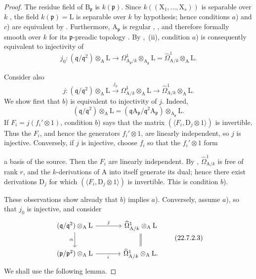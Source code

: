 \begin{proof}
The residue field of $\mathrm{B}_\mathfrak{p}$ is $k(\mathfrak{p})$.
Since $k((\mathrm{X}_1,\ldots,\mathrm{X}_s))$ is separable over $k$ , the field $k(\mathfrak{p})=\mathrm{L}$ is separable over $k$ by hypothesis; hence conditions $a$) and $c$) are equivalent by .
Furthermore, $\mathrm{A}_\mathfrak{p}$ is regular , , and therefore formally smooth over $k$ for its $\mathfrak{p}$-preadic topology .
By ,~(ii), condition $a$) is consequently equivalent to injectivity of
\begin{equation}
\label{0.22.7.2.1}
  j_0:(\mathfrak{q}/\mathfrak{q}^2)\otimes_\mathrm{A}\mathrm{L}
  \longrightarrow \Omega^1_{\mathrm{A}_\mathfrak{p}/k}\otimes_{\mathrm{A}_\mathfrak{p}}\mathrm{L}
  =\widehat{\Omega}^1_{\mathrm{A}/k}\otimes_\mathrm{A}\mathrm{L}.
  \tag{22.7.2.1}
\end{equation}

Consider also
\begin{equation}
\label{0.22.7.2.2}
  j:(\mathfrak{q}/\mathfrak{q}^2)\otimes_\mathrm{A}\mathrm{L}
  \xrightarrow{j_0}\Omega^1_{\mathrm{A}/k}\otimes_\mathrm{A}\mathrm{L}
  \longrightarrow\widehat{\Omega}^1_{\mathrm{A}/k}\otimes_\mathrm{A}\mathrm{L}.
  \tag{22.7.2.2}
\end{equation}
We show first that $b$) is equivalent to injectivity of $j$.
Indeed,
\[
  (\mathfrak{q}/\mathfrak{q}^2)\otimes_\mathrm{A}\mathrm{L}
  =(\mathfrak{q}\mathrm{A}_\mathfrak{p}/\mathfrak{q}^2\mathrm{A}_\mathfrak{p})\otimes_{\mathrm{A}_\mathfrak{p}}\mathrm{L}.
\]
If $F_i=j(f_i'\otimes 1)$, condition $b$) says that the matrix $(\langle F_i,\mathrm{D}_j\otimes 1\rangle)$ is invertible.
Thus the $F_i$, and hence the generators $f_i'\otimes 1$, are linearly independent, so $j$ is injective.
Conversely, if $j$ is injective, choose $f_i$ so that the
$f_i'\otimes 1$ form


a basis of the source.
Then the $F_i$ are linearly independent.
By , $\widehat{\Omega}^1_{\mathrm{A}/k}$ is free of rank $r$, and the $k$-derivations of $\mathrm{A}$ into itself generate its dual; hence there exist derivations $\mathrm{D}_j$ for which $(\langle F_i,\mathrm{D}_j\otimes 1\rangle)$ is invertible.
This is condition $b$).

These observations show already that $b$) implies $a$).
Conversely, assume $a$), so that $j_0$ is injective, and consider
\begin{equation}
\label{0.22.7.2.3}
\begin{tikzcd}[column sep=large]
  (\mathfrak{q}/\mathfrak{q}^2)\otimes_\mathrm{A}\mathrm{L} \ar[r,"j"] \ar[d,"\alpha"'] & \widehat{\Omega}^1_{\mathrm{A}/k}\otimes_\mathrm{A}\mathrm{L} \ar[d,equal] \\
  (\mathfrak{p}/\mathfrak{p}^2)\otimes_\mathrm{A}\mathrm{L} \ar[r,"i"'] & \widehat{\Omega}^1_{\mathrm{A}/k}\otimes_\mathrm{A}\mathrm{L}.
\end{tikzcd}
\tag{22.7.2.3}
\end{equation}
We shall use the following lemma.
\end{proof}

